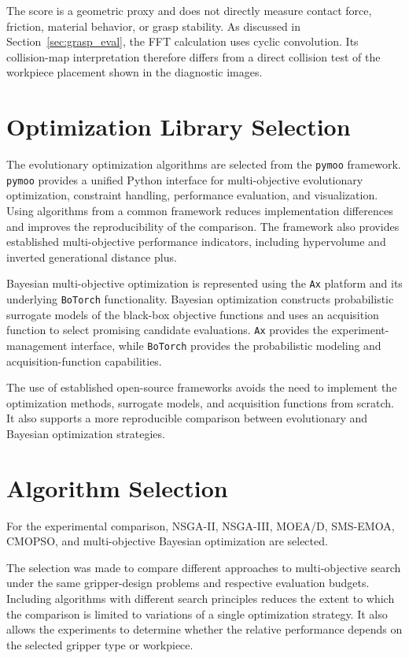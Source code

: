 The score is a geometric proxy and does not directly measure contact
force, friction, material behavior, or grasp stability. As discussed in
Section~\ref{sec:grasp_eval}, the FFT calculation uses cyclic
convolution. Its collision-map interpretation therefore differs from a
direct collision test of the workpiece placement shown in the diagnostic
images.

\section{Optimization Library Selection}
\label{sec:methodology_library}

The evolutionary optimization algorithms are selected from the \texttt{pymoo} framework. \texttt{pymoo} provides a unified Python interface for
multi-objective evolutionary optimization, constraint handling, performance evaluation, and visualization. Using algorithms from a common framework
reduces implementation differences and improves the reproducibility of the comparison. The framework also provides established multi-objective
performance indicators, including hypervolume and inverted generational distance plus.~\cite{pymoo}

Bayesian multi-objective optimization is represented using the \texttt{Ax} platform and its underlying \texttt{BoTorch} functionality. Bayesian
optimization constructs probabilistic surrogate models of the black-box objective functions and uses an acquisition function to select promising
candidate evaluations. \texttt{Ax} provides the experiment-management interface, while \texttt{BoTorch} provides the probabilistic modeling and
acquisition-function capabilities.~\cite{olson2025ax,botorch}

The use of established open-source frameworks avoids the need to implement the optimization methods, surrogate models, and acquisition functions from
scratch. It also supports a more reproducible comparison between evolutionary and Bayesian optimization strategies.

\section{Algorithm Selection}
\label{sec:methodology_algorithm_selection}

For the experimental comparison, NSGA-II, NSGA-III, MOEA/D, SMS-EMOA, CMOPSO, and multi-objective Bayesian optimization are selected.

The selection was made to compare different approaches to multi-objective search under the same gripper-design problems and respective evaluation budgets.
Including algorithms with different search principles reduces the extent to which the comparison is limited to variations of a single optimization
strategy. It also allows the experiments to determine whether the relative performance depends on the selected gripper type or workpiece.

